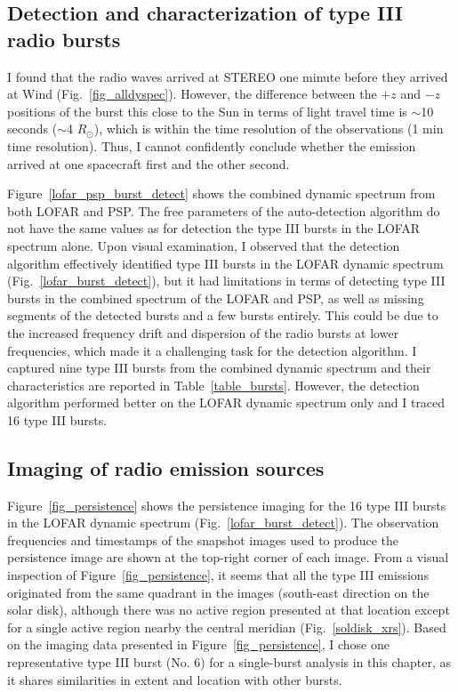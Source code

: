 \subsection{Detection and characterization of type III radio bursts}
I found that the radio waves arrived at STEREO one minute before they arrived at Wind (Fig.~\ref{fig_alldyspec}). However, the difference between the $+z$ and $-z$ positions of the burst this close to the Sun in terms of light travel time is $\sim$10 seconds ($\sim$4 $R_\odot$), which is within the time resolution of the observations (1 min time resolution). Thus, I cannot confidently conclude whether the emission arrived at one spacecraft first and the other second.

Figure~\ref{lofar_psp_burst_detect} shows the combined dynamic spectrum from both LOFAR and PSP. The free parameters of the auto-detection algorithm do not have the same values as for detection the type III bursts in the LOFAR spectrum alone.
Upon visual examination, I observed that the detection algorithm effectively identified type III bursts in the LOFAR dynamic spectrum (Fig.~\ref{lofar_burst_detect}), but it had limitations in terms of detecting type III bursts in the combined spectrum of the LOFAR and PSP, as well as missing segments of the detected bursts and a few bursts entirely.
This could be due to the increased frequency drift and dispersion of the radio bursts at lower frequencies, which made it a challenging task for the detection algorithm.
I captured nine type III bursts from the combined dynamic spectrum and their characteristics are reported in Table~\ref{table_bursts}.
However, the detection algorithm performed better on the LOFAR dynamic spectrum only and I traced 16 type III bursts.

\subsection{Imaging of radio emission sources}
Figure~\ref{fig_persistence} shows the persistence imaging for the 16 type III bursts in the LOFAR dynamic spectrum (Fig.~\ref{lofar_burst_detect}). The observation frequencies and timestamps of the snapshot images used to produce the persistence image are shown at the top-right corner of each image.
From a visual inspection of Figure~\ref{fig_persistence}, it seems that all the type III emissions originated from the same quadrant in the images (south-east direction on the solar disk), although there was no active region presented at that location except for a single active region nearby the central meridian (Fig.~\ref{soldisk_xrs}).
Based on the imaging data presented in Figure~\ref{fig_persistence}, I chose one representative type III burst (No. 6) for a single-burst analysis in this chapter, as it shares similarities in extent and location with other bursts.


